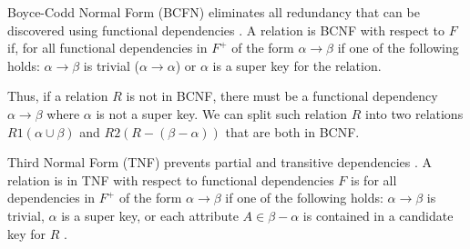 Boyce-Codd Normal Form (BCFN) eliminates all redundancy that can be discovered using functional dependencies \cite[Chapter 7.3.1]{DBSBook}. 
A relation is BCNF with respect to $F$ if, for all functional dependencies in $F^+$ of the form $\alpha \rightarrow \beta$ if one of the following holds:
$\alpha \rightarrow \beta$ is trivial ($\alpha \rightarrow \alpha$) or $\alpha$ is a super key for the relation.

Thus, if a relation $R$ is not in BCNF, there must be a functional dependency $\alpha \rightarrow \beta$ where $\alpha$ is not a super key.
We can split such relation $R$ into two relations $R1(\alpha \cup \beta)$ and $R2(R-(\beta-\alpha))$ that are both in BCNF.

Third Normal Form (TNF) prevents partial and transitive dependencies \cite{MontayaNormalForms}.
A relation is in TNF with respect to functional dependencies $F$ is for all dependencies in $F^+$ of the form $\alpha \rightarrow \beta$ if one of the following holds: 
$\alpha \rightarrow \beta$ is trivial, $\alpha$ is a super key, or each attribute $A \in \beta-\alpha$ is contained in a candidate key for $R$ \cite[Chapter 7.5.2]{DBSBook}.
